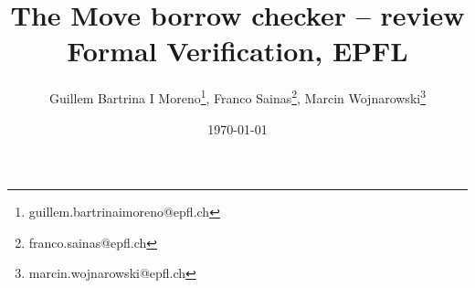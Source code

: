 \documentclass[notitlepage]{article}
\title{The Move borrow checker -- review\\\large Formal Verification, EPFL}
\author{
	Guillem Bartrina I Moreno\thanks{guillem.bartrinaimoreno@epfl.ch},
	Franco Sainas\thanks{franco.sainas@epfl.ch},
	Marcin Wojnarowski\thanks{marcin.wojnarowski@epfl.ch}
}
\date{\today}
\begin{document}
\maketitle

\begin{abstract}
	\lipsum[1]
\end{abstract}
\end{document}

